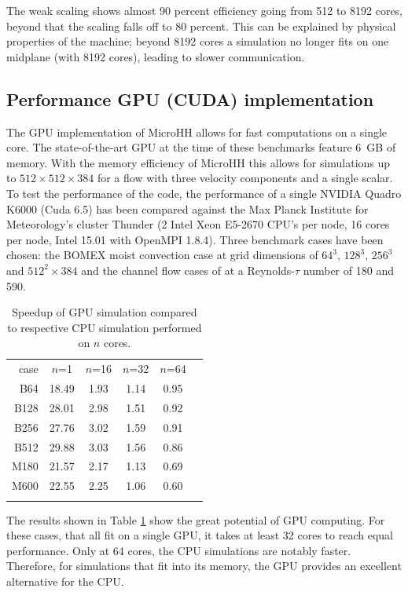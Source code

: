 \documentclass[gmd]{copernicus}
\begin{document}
The weak scaling shows almost 90 percent efficiency going from 512 to 8192 cores, beyond that the scaling falls off to 80 percent. This can be explained by physical properties of the machine;  beyond 8192 cores a simulation no longer fits on one midplane (with 8192 cores), leading to slower communication.

\subsection{Performance GPU (CUDA) implementation}
The GPU implementation of MicroHH allows for fast computations on a single core. The state-of-the-art GPU at the time of these benchmarks feature 6~GB of memory. With the memory efficiency of MicroHH this allows for simulations up to $512 \times 512 \times 384$ for a flow with three velocity components and a single scalar. To test the performance of the code, the performance of a single NVIDIA Quadro K6000 (Cuda 6.5) has been compared against the Max Planck Institute for Meteorology's cluster Thunder (2 Intel Xeon E5-2670 CPU's per node, 16 cores per node, Intel 15.01 with OpenMPI 1.8.4). Three benchmark cases have been chosen: the BOMEX moist convection case at grid dimensions of $64^3$, $128^3$, $256^3$ and $512^2 \times 384$ and the channel flow cases of \citet{Moser1999} at a Reynolds-$\tau$ number of 180 and 590.

\begin{table}[t]
	\caption{Speedup of GPU simulation compared to respective CPU simulation performed on $n$ cores.}\label{tab:gpu}
	\begin{tabular}{rccccc}
		\tophline
		case & $n$=1 & $n$=16 & $n$=32 & $n$=64   \\
		\middlehline
		B64  & 18.49 & 1.93 & 1.14 & 0.95 \\
		B128 & 28.01 & 2.98 & 1.51 & 0.92 \\
		B256 & 27.76 & 3.02 & 1.59 & 0.91 \\
		B512 & 29.88 & 3.03 & 1.56 & 0.86 \\
		\middlehline
		M180 & 21.57 & 2.17 & 1.13 & 0.69 \\
		M600 & 22.55 & 2.25 & 1.06 & 0.60 \\
		\bottomhline
	\end{tabular}
\end{table}

The results shown in Table \ref{tab:gpu} show the great potential of GPU computing. For these cases, that all fit on a single GPU, it takes at least 32 cores to reach equal performance. Only at 64 cores, the CPU simulations are notably faster. Therefore, for simulations that fit into its memory, the GPU provides an excellent alternative for the CPU.
\end{document}
